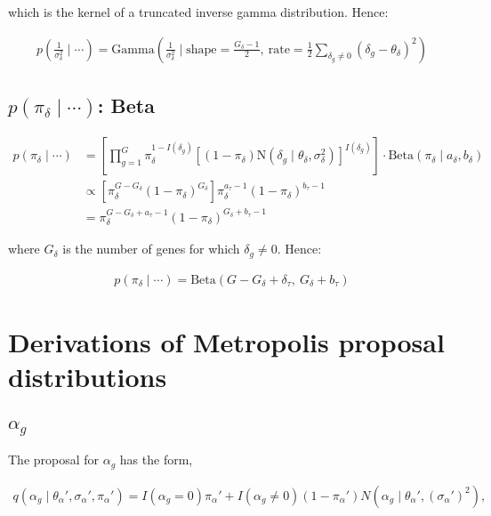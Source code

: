 \documentclass{article}\usepackage{graphicx, color}
\begin{document}
\begin{flushleft}
which is the kernel of a truncated inverse gamma distribution. Hence:

\begin{align*}
p( \frac{1}{\sigma_\delta^2} \mid \cdots ) = \text{Gamma} \left (\frac{1}{\sigma_\delta^2} \mid \text{shape} = \frac{G_\delta - 1}{2}, \ \text{rate} = \frac{1}{2} \sum_{\delta_g \ne 0} (\delta_g - \theta_\delta)^2 \right )
\end{align*}




\subsection{$p(\pi_\delta \mid \cdots)$: Beta}

\begin{align*}
p(\pi_\delta \mid \cdots) &=\left [ \prod_{g = 1}^G  \pi_\delta^{1-I(\delta_g)}[(1- \pi_\delta)\text{N}(\delta_g \mid \theta_\delta, \sigma_\delta^2)]^{I(\delta_g)} \right ] \cdot \text{Beta}(\pi_\delta \mid a_\delta, b_\delta)  \\
&\propto [\pi_\delta^{G - G_\delta}(1-\pi_\delta)^{G_\delta}] \pi_\delta^{a_\tau - 1} (1 - \pi_\delta)^{b_\tau - 1} \\
&= \pi_{\delta}^{G - G_\delta + a_\tau - 1}(1 - \pi_\delta)^{G_\delta + b_\tau - 1}
\end{align*}

where $G_\delta$ is the number of genes for which $\delta_g \ne 0$. Hence:

\begin{align*}
p(\pi_\delta \mid \cdots) = \text{Beta}(G - G_\delta + \delta_\tau, \ G_\delta + b_\tau)
\end{align*}







\section{Derivations of Metropolis proposal distributions}


\subsection{$\alpha_g$}

The proposal for $\alpha_g$ has the form,

\begin{align*}
q(\alpha_g \mid \theta_\alpha', \sigma_\alpha', \pi_\alpha') = I(\alpha_g = 0) \pi_\alpha'  + I(\alpha_g \ne 0) (1 - \pi_\alpha') N(\alpha_g \mid \theta_\alpha', (\sigma_\alpha')^2),
\end{align*}


\end{flushleft}
\end{document}
